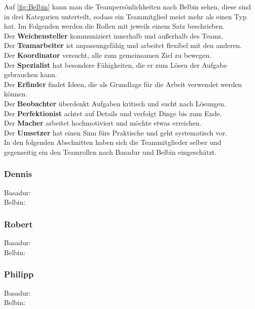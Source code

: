 \documentclass[a4paper,12pt,headsepline]{scrartcl}
\begin{document}
		Auf \cref{fig:Belbin} kann man die Teampersönlichkeiten nach Belbin sehen, diese sind in drei Kategorien unterteilt, sodass ein Teammitglied meist mehr als einen Typ hat. Im Folgenden werden die Rollen mit jeweils einem Satz beschrieben.\\
		Der \textbf{Weichensteller} kommuniziert innerhalb und außerhalb des Teams.\\
		Der \textbf{Teamarbeiter} ist anpassungsfähig und arbeitet flexibel mit den anderen.\\
		Der \textbf{Koordinator} versucht, alle zum gemeinsamen Ziel zu bewegen.\\
		Der \textbf{Spezialist} hat besondere Fähigkeiten, die er zum Lösen der Aufgabe gebrauchen kann.\\
		Der \textbf{Erfinder} findet Ideen, die als Grundlage für die Arbeit verwendet werden können.\\
		Der \textbf{Beobachter} überdenkt Aufgaben kritisch und sucht nach Lösungen.\\
		Der \textbf{Perfektionist} achtet auf Details und verfolgt Dinge bis zum Ende.\\
		Der \textbf{Macher} arbeitet hochmotiviert und möchte etwas erreichen.\\
		Der \textbf{Umsetzer} hat einen Sinn fürs Praktische und geht systematisch vor.\\
		
		In den folgenden Abschnitten haben sich die Teammitglieder selber und gegenseitig ein den Teamrollen nach Basadur und Belbin eingeschätzt.
		\subsubsection{Dennis}
		Basadur: \\
		Belbin: 
		\subsubsection{Robert}
		Basadur: \\
		Belbin: 
		\subsubsection{Philipp}
		Basadur: \\
		Belbin: 
\end{document}
